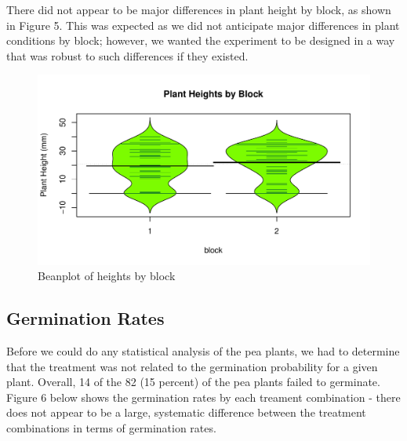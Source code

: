 \documentclass[1p,12pt]{elsarticle}\usepackage[]{graphicx}\usepackage[]{color}
\makeatletter
\def\maxwidth{ %
  \ifdim\Gin@nat@width>\linewidth
    \linewidth
  \else
    \Gin@nat@width
  \fi
}
\newenvironment{knitrout}{}{} %
\makeatother
\begin{document}
There did not appear to be major differences in plant height by block, as shown in Figure 5. This was expected as we did not anticipate major differences in plant conditions by block; however, we wanted the experiment to be designed in a way that was robust to such differences if they existed. 

\begin{knitrout}
\color{fgcolor}\begin{figure}
\includegraphics[width=\maxwidth]{figure/block_bean-1} \caption[Beanplot of heights by block]{Beanplot of heights by block}\label{fig:block_bean}
\end{figure}


\end{knitrout}


\subsection{Germination Rates}
Before we could do any statistical analysis of the pea plants, we had to determine that the treatment was not related to the germination probability for a given plant. Overall, 14 of the 82 (15 percent) of the pea plants failed to germinate. Figure 6 below shows the germination rates by each treament combination - there does not appear to be a large, systematic difference between the treatment combinations in terms of germination rates. 
\end{document}
